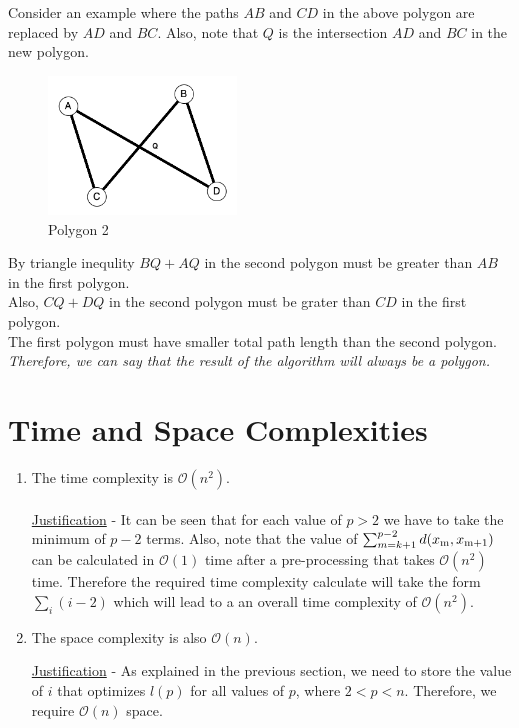 \documentclass[12pt,letterpaper]{article}
\begin{document}
        Consider an example where the paths $AB$ and $CD$ in the above polygon are replaced by $AD$ and $BC$. Also, note that $Q$ is the intersection $AD$ and $BC$ in the new polygon.

        \begin{figure}[htp]
            \centering
                \includegraphics[width=5cm]{JuCfnLBJBYpfEIdK.png}
                \caption{Polygon 2}
            \label{fig:galaxy}
        \end{figure}

        By triangle inequlity $BQ + AQ$ in the second polygon must be greater than $AB$ in the first polygon. \\
        Also, $CQ + DQ$ in the second polygon must be grater than $CD$ in the first polygon. \\
        The first polygon must have smaller total path length than the second polygon. \\

        \emph{Therefore, we can say that the result of the algorithm will always be a polygon.}

\section*{Time and Space Complexities}

    \begin{enumerate}
        \item The time complexity is $\mathcal{O}(n^2)$.\\\\
        \underline{Justification} -
            It can be seen that for each value of $p > 2$ we have to take the minimum of $p-2$ terms. Also, note that the value of $\sum_{m=k+1}^{p-2} d(x\textsubscript{m}, x\textsubscript{m+1})$ can be calculated in $\mathcal{O}(1)$ time after a pre-processing that takes $\mathcal{O}(n^2)$ time. Therefore the required time complexity calculate will take the form $\sum_i (i-2)$ which will lead to a an overall time complexity of $\mathcal{O}(n^2)$.

        \item The space complexity is also $\mathcal{O}(n)$.

        \underline{Justification} -
            As explained in the previous section, we need to store the value of $i$ that optimizes $l(p)$ for all values of $p$, where $2 < p < n$. Therefore, we require $\mathcal{O}(n)$ space.

    \end{enumerate}
\end{document}
